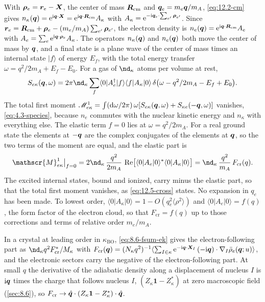 With $\bm{\rho}_e = \bm{r}_e - \bm{X}$, the center of mass $\bm{R}_{\mathrm{cm}}$ and $\bm{q}_e = m_e\bm{q}/m_A$, \cref{eq:12.2-cm} gives $n_\kappa(\bm{q}) = \mathrm{e}^{\mathrm{i}\bm{q}\cdot\bm{X}} = \mathrm{e}^{\mathrm{i}\bm{q}\cdot\bm{R}_{\mathrm{cm}}}A_\kappa$ with $A_\kappa = \mathrm{e}^{-\mathrm{i}\bm{q}_e\cdot\sum_{e'}\bm{\rho}_{e'}}$. Since $\bm{r}_e = \bm{R}_{\mathrm{cm}} + \bm{\rho}_e - (m_e/m_A)\sum_{e'}\bm{\rho}_{e'}$, the electron density is $n_e(\bm{q}) = \mathrm{e}^{\mathrm{i}\bm{q}\cdot\bm{R}_{\mathrm{cm}}}A_e$ with $A_e = \sum_e\mathrm{e}^{\mathrm{i}\bm{q}\cdot\bm{\rho}_e}A_\kappa$. The operators $n_\kappa(\bm{q})$ and $n_e(\bm{q})$ both move the center of mass by $\bm{q}$, and a final state is a plane wave of the center of mass times an internal state $|f\rangle$ of energy $E_f$, with the total energy transfer $\omega = q^2/2m_A + E_f - E_0$. For a gas of $\nd_\kappa$ atoms per volume at rest,
\begin{equation*}
  S_{e\kappa}(\vect{q},\omega) = 2\pi\nd_\kappa\sum_f\langle0|A_e^\dagger|f\rangle\langle f|A_\kappa|0\rangle\,\delta\bigl(\omega - q^2/2m_A - E_f + E_0\bigr) .
\end{equation*}
The total first moment $\mathscr{M}^1_{e\kappa} = \int(\mathrm{d}\omega/2\pi)\,\omega[S_{e\kappa}(\bm{q},\omega) + S_{\kappa e}(-\bm{q},\omega)]$ vanishes, \cref{eq:4.3-species}, because $n_e$ commutes with the nuclear kinetic energy and $n_\kappa$ with everything else. The elastic term $f = 0$ lies at $\omega = q^2/2m_A$. For a real ground state the elements at $-\bm{q}$ are the complex conjugates of the elements at $\bm{q}$, so the two terms of the moment are equal, and the elastic part is
\begin{equation*}
  \mathscr{M}^1_{e\kappa}\big|_{f = 0} = 2\nd_\kappa\,\frac{q^2}{2m_A}\,\Real\bigl[\langle0|A_e|0\rangle^*\langle0|A_\kappa|0\rangle\bigr] = \nd_\kappa\,\frac{q^2}{m_A}\,F_{\mathrm{cr}}(q) .
\end{equation*}
The excited internal states, bound and ionized, carry minus the elastic part, so that the total first moment vanishes, as \cref{eq:12.5-cross} states. No expansion in $q_e$ has been made. To lowest order, $\langle0|A_\kappa|0\rangle = 1 - O(q_e^2\langle\rho^2\rangle)$ and $\langle0|A_e|0\rangle = f(q)$, the form factor of the electron cloud, so that $F_{\mathrm{cr}} = f(q)$ up to those corrections and terms of relative order $m_e/m_A$.

In a crystal at leading order in $\kappa_{\mathrm{BO}}$, \cref{eq:8.6-fsum-ek} gives the electron-following part as $\nd_\kappa q^2F_{\mathrm{cr}}^*/M_\kappa$ with $F_{\mathrm{cr}}(\bm{q}) = (N_\kappa q^2)^{-1}\langle\sum_{I\in\kappa}\mathrm{e}^{-\mathrm{i}\bm{q}\cdot\bm{X}_I}\,(-\mathrm{i}\bm{q})\cdot\nabla_I\bar\rho_e(\bm{q};u)\rangle$, and the electronic sectors carry the negative of the electron-following part. At small $q$ the derivative of the adiabatic density along a displacement of nucleus $I$ is $\mathrm{i}\bm{q}$ times the charge that follows nucleus $I$, $(Z_\kappa\mathbf{1} - Z^*_\kappa)$ at zero macroscopic field (\cref{sec:8.6}), so $F_{\mathrm{cr}} \to \hat{\bm{q}}\cdot(Z_\kappa\mathbf{1} - Z^*_\kappa)\cdot\hat{\bm{q}}$.

